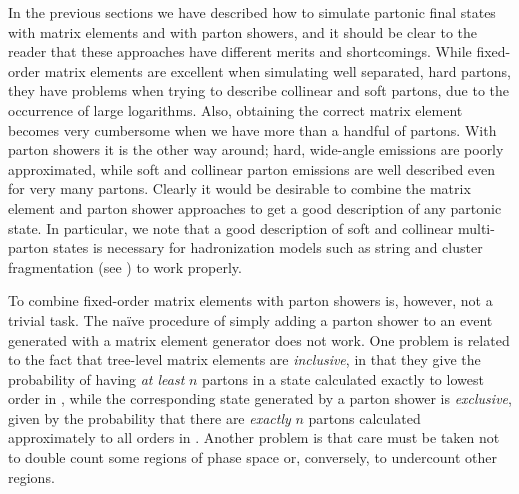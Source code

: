 
\label{sec:matching:introduction}

In the previous sections we have described how to simulate
partonic final states with matrix elements and with parton showers,
and it should be clear to the reader that these approaches have
different merits and shortcomings. While fixed-order matrix elements
are excellent when simulating well separated, hard partons, they have
problems when trying to describe collinear and soft partons, due to the
occurrence of large logarithms. 
Also, obtaining the correct matrix element becomes very cumbersome when
we have more than a handful of partons. With parton showers it is the
other way around; hard, wide-angle emissions are poorly approximated,
while soft and collinear parton emissions are well described even for
very many partons. Clearly it would be desirable to combine the matrix
element and parton shower approaches to get a good description of any
partonic state. In particular, we note that a good description of soft
and collinear multi-parton states is necessary for hadronization
models such as string and cluster fragmentation (see
) to work properly.

To combine fixed-order matrix elements with parton showers is,
however, not a trivial task. The na\"ive procedure of simply adding a
parton shower to an event generated with a matrix element generator
does not work. One problem is related to the fact that tree-level
matrix elements are \textit{inclusive}, in that they give the
probability of having \textit{at least} $n$ partons in a state
calculated exactly to lowest order in \alphaS, while the
corresponding state generated by a parton shower is
\textit{exclusive}, given by the probability that there are
\textit{exactly} $n$ partons calculated approximately to all orders in
\alphaS. Another problem is that care must be taken not to double
count some regions of phase space or, conversely, to undercount other
regions.

